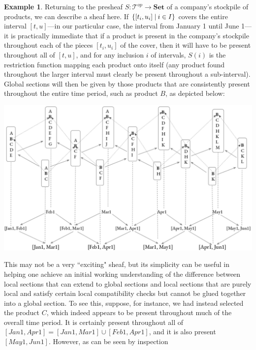 \documentclass[11pt]{book}
\theoremstyle{definition}
\newtheorem{example}{Example}[section]
\theoremstyle{definition}
\theoremstyle{definition}
\theoremstyle{theorem}
\theoremstyle{definition}
\begin{document}
\begin{example}
	Returning to the presheaf $S: \mathcal{T}^{op} \rightarrow \textbf{Set}$ of a company's stockpile of products, we can describe a sheaf here. If $\{[t_i, u_i] \hspace*{0.25em}| \hspace*{0.25em} i \in I \}$ covers the entire interval $[t,u]$---in our particular case, the interval from January 1 until June 1---it is practically immediate that if a product is present in the company's stockpile throughout each of the pieces $[t_i, u_i]$ of the cover, then it will have to be present throughout all of $[t,u]$, and for any inclusion $i$ of intervals, $S(i)$ is the restriction function mapping each product onto itself (any product found throughout the larger interval must clearly be present throughout a sub-interval). Global sections will then be given by those products that are consistently present throughout the entire time period, such as product $B$, as depicted below: 
	\begin{center}
		\includegraphics*[scale=0.25]{GlobalSectionTimeIntervalDiagram.png}
	\end{center}  
	This may not be a very ``exciting" sheaf, but its simplicity can be useful in helping one achieve an initial working understanding of the difference between local sections that can extend to global sections and local sections that are purely local and satisfy certain local compatibility checks but cannot be glued together into a global section. To see this, suppose, for instance, we had instead selected the product $C$, which indeed appears to be present throughout much of the overall time period. It is certainly present throughout all of $[Jan1, Apr1] = [Jan1, Mar1] \cup [Feb1, Apr1]$, and it is also present $[May1, Jun1]$. However, as can be seen by inspection 

\end{example}
\end{document}
